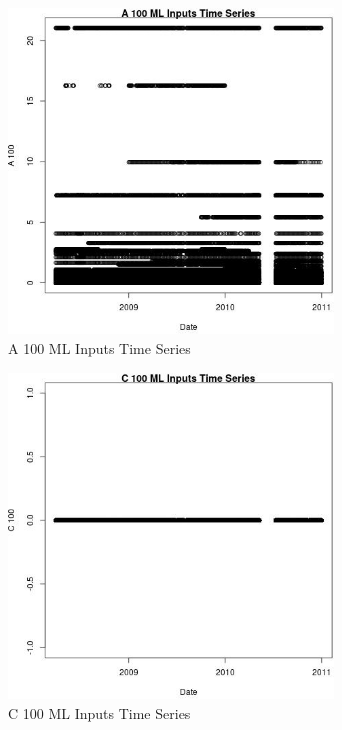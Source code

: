 \begin{figure} 
\centering  
\includegraphics[width=0.77\textwidth]{Code_Outputs/ML_input_report_ML_input_PM25_Step5_part_d_de_duplicated_aves_ML_input_A_100vDate.jpg} 
\caption{\label{fig:ML_input_report_ML_input_PM25_Step5_part_d_de_duplicated_aves_ML_inputA_100vDate}A 100 ML Inputs Time Series} 
\end{figure} 
 

\begin{figure} 
\centering  
\includegraphics[width=0.77\textwidth]{Code_Outputs/ML_input_report_ML_input_PM25_Step5_part_d_de_duplicated_aves_ML_input_C_100vDate.jpg} 
\caption{\label{fig:ML_input_report_ML_input_PM25_Step5_part_d_de_duplicated_aves_ML_inputC_100vDate}C 100 ML Inputs Time Series} 
\end{figure} 
 

